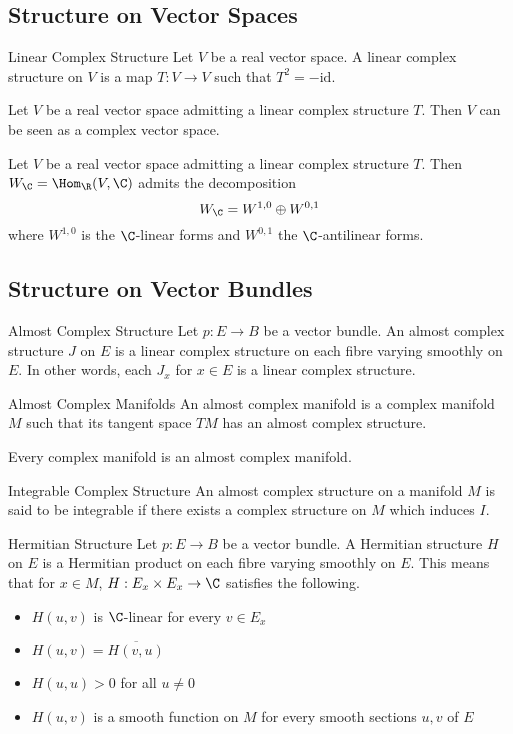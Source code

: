 \documentclass[a4paper]{article}
\begin{document}
\subsection{Structure on Vector Spaces}
\begin{defn}{Linear Complex Structure}{} Let $V$ be a real vector space. A linear complex structure on $V$ is a map $T:V\to V$ such that $T^2=-\text{id}$. 
\end{defn}

\begin{prp}{}{} Let $V$ be a real vector space admitting a linear complex structure $T$. Then $V$ can be seen as a complex vector space. 
\end{prp}

\begin{prp}{}{} Let $V$ be a real vector space admitting a linear complex structure $T$. Then $W_\C=\Hom_\R(V,\C)$ admits the decomposition $$W_\C=W^{1,0}\oplus W^{0,1}$$ where $W^{1,0}$ is the $\C$-linear forms and $W^{0,1}$ the $\C$-antilinear forms. 
\end{prp}

\subsection{Structure on Vector Bundles}
\begin{defn}{Almost Complex Structure}{} Let $p:E\to B$ be a vector bundle. An almost complex structure $J$ on $E$ is a linear complex structure on each fibre varying smoothly on $E$. In other words, each $J_x$ for $x\in E$ is a linear complex structure. 
\end{defn}

\begin{defn}{Almost Complex Manifolds}{} An almost complex manifold is a complex manifold $M$ such that its tangent space $TM$ has an almost complex structure. 
\end{defn}

\begin{prp}{}{} Every complex manifold is an almost complex manifold. 
\end{prp}

\begin{defn}{Integrable Complex Structure}{} An almost complex structure on a manifold $M$ is said to be integrable if there exists a complex structure on $M$ which induces $I$. 
\end{defn}

\begin{defn}{Hermitian Structure}{} Let $p:E\to B$ be a vector bundle. A Hermitian structure $H$ on $E$ is a Hermitian product on each fibre varying smoothly on $E$. This means that for $x\in M$, $H:E_x\times E_x\to\C$ satisfies the following.
\begin{itemize}
\item $H(u,v)$ is $\C$-linear for every $v\in E_x$
\item $H(u,v)=\overline{H(v,u)}$
\item $H(u,u)>0$ for all $u\neq 0$
\item $H(u,v)$ is a smooth function on $M$ for every smooth sections $u,v$ of $E$
\end{itemize}
\end{defn}
\end{document}
